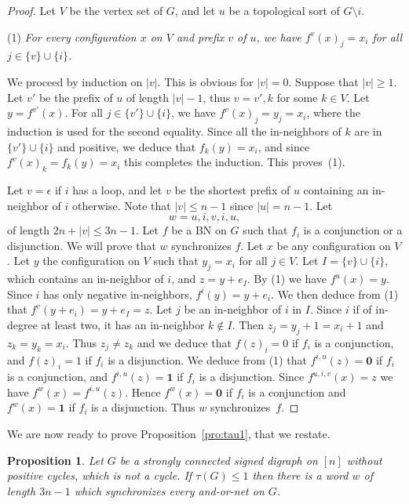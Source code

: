 \documentclass[11pt,letter]{article}
\newtheorem{proposition}{Proposition}
\newcommand{\ONE}{\mathbf{1}}
\newcommand{\ZERO}{{\mathbf{0}}}
\begin{document}
\begin{proof}
Let $V$ be the vertex set of $G$, and let $u$ be a topological sort of $G\setminus i$.

\bigskip
\noindent
(1) {\em For every configuration $x$ on $V$ and prefix $v$ of $u$, we have $f^v(x)_j=x_i$ for all $j\in\{v\}\cup\{i\}$.}

\medskip
\noindent
We proceed by induction on $|v|$. This is obvious for $|v|=0$. Suppose that $|v|\geq 1$. Let $v'$ be the prefix of $u$ of length $|v|-1$, thus $v=v',k$ for some $k\in V$. Let $y=f^{v'}(x)$. For all $j\in\{v'\}\cup\{i\}$, we have $f^v(x)_j=y_j=x_i$, where the induction is used for the second equality. Since all the in-neighbors of $k$ are in $\{v'\}\cup\{i\}$ and positive, we deduce that $f_k(y)=x_i$, and since $f^v(x)_k=f_k(y)=x_i$ this completes the induction. This proves~(1).   

\bigskip
Let $v=\epsilon$ if $i$ has a loop, and let $v$ be the shortest prefix of $u$ containing an in-neighbor of $i$ otherwise. Note that $|v|\leq n-1$ since $|u|=n-1$. Let 
\[
w=u,i,v,i,u,
\]
of length $2n+|v|\leq 3n-1$. Let $f$ be a BN on $G$ such that $f_i$ is a conjunction or a disjunction. We will prove that $w$ synchronizes $f$. Let $x$ be any configuration on $V$. Let $y$ the configuration on $V$ such that $y_j=x_i$ for all $j\in V$. Let $I=\{v\}\cup\{i\}$, which contains an in-neighbor of $i$, and $z=y+e_I$. By (1) we have $f^u(x)=y$. Since $i$ has only negative in-neighbors, $f^i(y)=y+e_i$. We then deduce from (1) that $f^v(y+e_i)=y+e_I=z$. Let $j$ be an in-neighbor of $i$ in $I$. Since $i$ if of in-degree at least two, it has an in-neighbor $k\not\in I$. Then $z_j=y_j+1=x_i+1$ and $z_k=y_k=x_i$. Thus $z_j\neq z_k$ and we deduce that $f(z)_i=0$ if $f_i$ is a conjunction, and $f(z)_i=1$ if $f_i$ is a disjunction. We deduce from (1) that $f^{i,u}(z)=\ZERO$ if $f_i$ is a conjunction, and $f^{i,u}(z)=\ONE$ if $f_i$ is a disjunction. Since $f^{u,i,v}(x)=z$ we have $f^w(x)=f^{i,u}(z)$. Hence $f^w(x)=\ZERO$ if $f_i$ is a conjunction and $f^w(x)=\ONE$ if $f_i$ is a disjunction. Thus $w$ synchronizes~$f$. 
\end{proof}

We are now ready to prove Proposition~\ref{pro:tau1}, that we restate. 

\setcounter{proposition}{4}
\begin{proposition}
Let $G$ be a strongly connected signed digraph on $[n]$ without positive cycles, which is not a cycle. If $\tau(G)\leq 1$ then there is a word $w$ of length $3n-1$ which synchronizes every and-or-net on $G$.
\end{proposition}
\setcounter{proposition}{10}
\end{document}
